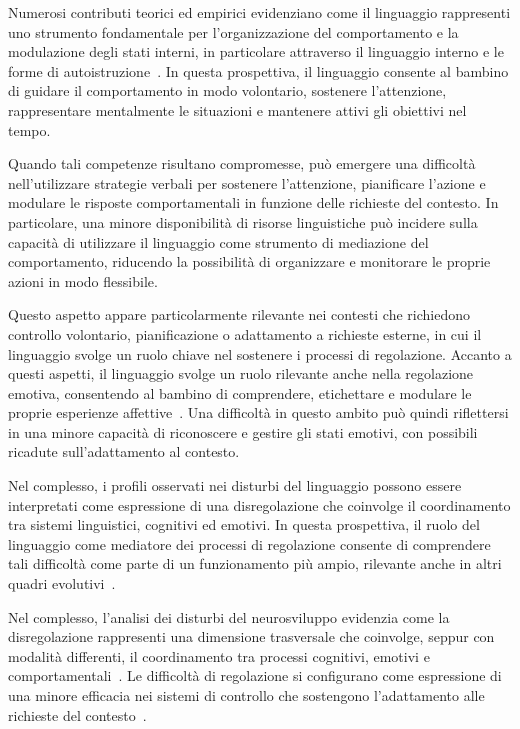            Numerosi contributi teorici ed empirici evidenziano come il linguaggio rappresenti uno strumento fondamentale per l'organizzazione del comportamento e la modulazione degli stati interni, in particolare attraverso il linguaggio interno e le forme di autoistruzione~\cite{vygotsky1962,zelazo2015,vallotton2011}. In questa prospettiva, il linguaggio consente al bambino di guidare il comportamento in modo volontario, sostenere l'attenzione, rappresentare mentalmente le situazioni e mantenere attivi gli obiettivi nel tempo.

            Quando tali competenze risultano compromesse, può emergere una difficoltà nell'utilizzare strategie verbali per sostenere l'attenzione, pianificare l'azione e modulare le risposte comportamentali in funzione delle richieste del contesto. In particolare, una minore disponibilità di risorse linguistiche può incidere sulla capacità di utilizzare il linguaggio come strumento di mediazione del comportamento, riducendo la possibilità di organizzare e monitorare le proprie azioni in modo flessibile.

            Questo aspetto appare particolarmente rilevante nei contesti che richiedono controllo volontario, pianificazione o adattamento a richieste esterne, in cui il linguaggio svolge un ruolo chiave nel sostenere i processi di regolazione. Accanto a questi aspetti, il linguaggio svolge un ruolo rilevante anche nella regolazione emotiva, consentendo al bambino di comprendere, etichettare e modulare le proprie esperienze affettive~\cite{eisenberg2010}. Una difficoltà in questo ambito può quindi riflettersi in una minore capacità di riconoscere e gestire gli stati emotivi, con possibili ricadute sull'adattamento al contesto.

            Nel complesso, i profili osservati nei disturbi del linguaggio possono essere interpretati come espressione di una disregolazione che coinvolge il coordinamento tra sistemi linguistici, cognitivi ed emotivi. In questa prospettiva, il ruolo del linguaggio come mediatore dei processi di regolazione consente di comprendere tali difficoltà come parte di un funzionamento più ampio, rilevante anche in altri quadri evolutivi~\cite{blair2015,zelazo2015}.

            Nel complesso, l'analisi dei disturbi del neurosviluppo evidenzia come la disregolazione rappresenti una dimensione trasversale che coinvolge, seppur con modalità differenti, il coordinamento tra processi cognitivi, emotivi e comportamentali~\cite{astle2022,beauchaine2019}. Le difficoltà di regolazione si configurano come espressione di una minore efficacia nei sistemi di controllo che sostengono l'adattamento alle richieste del contesto~\cite{blair2015,zelazo2020}.


